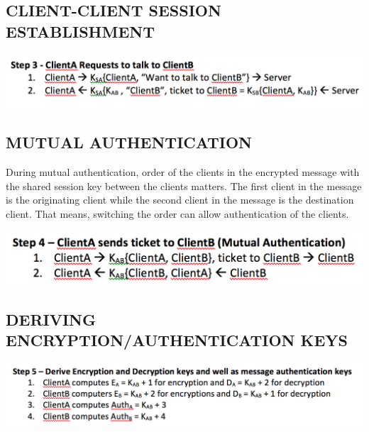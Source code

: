 \documentclass[twoside,letterpaper]{article}
\begin{document}
 \bigskip
 
\subsection{CLIENT-CLIENT SESSION ESTABLISHMENT}
\begin{flushleft}
\includegraphics[scale=0.5]{clientreq}
\end{flushleft}
 
\bigskip
 
\subsection{MUTUAL AUTHENTICATION}
During mutual authentication, order of the clients in the encrypted message with the shared session key between
the clients matters. The first client in the message is the originating client while the second client in the message
is the destination client. That means, switching the order can allow authentication of the clients.
\begin{flushleft}
\includegraphics[scale=0.5]{mauth}
\end{flushleft}
 
\bigskip
 
\subsection{DERIVING ENCRYPTION/AUTHENTICATION KEYS}
\begin{flushleft}
\includegraphics[scale=0.5]{keys}
\end{flushleft}
\end{document}
